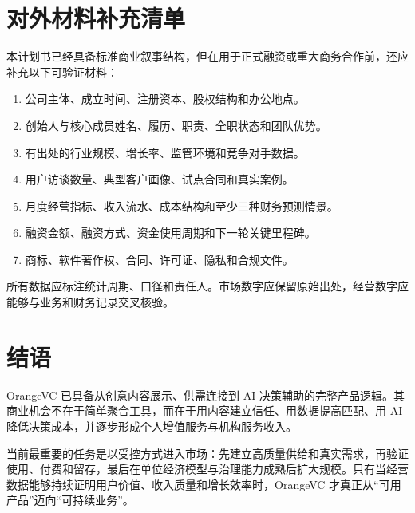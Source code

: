 \documentclass[12pt,a4paper,openany,fontset=fandol]{ctexrep}
\begin{document}
\chapter{对外材料补充清单}

本计划书已经具备标准商业叙事结构，但在用于正式融资或重大商务合作前，还应补充以下可验证材料：

\begin{enumerate}
  \item 公司主体、成立时间、注册资本、股权结构和办公地点。
  \item 创始人与核心成员姓名、履历、职责、全职状态和团队优势。
  \item 有出处的行业规模、增长率、监管环境和竞争对手数据。
  \item 用户访谈数量、典型客户画像、试点合同和真实案例。
  \item 月度经营指标、收入流水、成本结构和至少三种财务预测情景。
  \item 融资金额、融资方式、资金使用周期和下一轮关键里程碑。
  \item 商标、软件著作权、合同、许可证、隐私和合规文件。
\end{enumerate}

所有数据应标注统计周期、口径和责任人。市场数字应保留原始出处，经营数字应能够与业务和财务记录交叉核验。

\chapter{结语}

OrangeVC 已具备从创意内容展示、供需连接到 AI 决策辅助的完整产品逻辑。其商业机会不在于简单聚合工具，而在于用内容建立信任、用数据提高匹配、用 AI 降低决策成本，并逐步形成个人增值服务与机构服务收入。

当前最重要的任务是以受控方式进入市场：先建立高质量供给和真实需求，再验证使用、付费和留存，最后在单位经济模型与治理能力成熟后扩大规模。只有当经营数据能够持续证明用户价值、收入质量和增长效率时，OrangeVC 才真正从“可用产品”迈向“可持续业务”。
\end{document}
